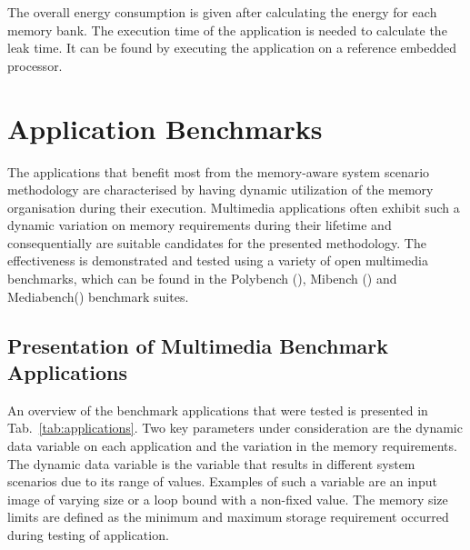 \documentclass{acm_proc_article-sp}
\begin{document}
 The overall energy consumption is given after calculating the energy for each memory bank. The execution time of the application is needed to calculate the leak time. It can be found by executing the application on a reference embedded processor.   
 
\section{Application Benchmarks}
\label{sec:applications}

The applications that benefit most from the memory-aware system scenario methodology are characterised by having dynamic utilization of the memory organisation during their execution. Multimedia applications often exhibit such a dynamic variation on memory requirements during their lifetime and consequentially are suitable candidates for the presented methodology. The effectiveness is demonstrated and tested using a variety of open multimedia benchmarks, which can be found in the Polybench (\cite{Poly}), Mibench (\cite{mibench}) and Mediabench(\cite{mediabench}) benchmark suites. 

\subsection{Presentation of Multimedia Benchmark Applications}

An overview of the benchmark applications that were tested is presented in Tab.~\ref{tab:applications}. Two key parameters under consideration are the dynamic data variable on each application and the variation in the memory requirements. The dynamic data variable is the variable that results in different system scenarios due to its range of values. Examples of such a variable are an input image of varying size or a loop bound with a non-fixed value. The memory size limits are defined as the minimum and maximum storage requirement occurred during testing of application.
\end{document}
